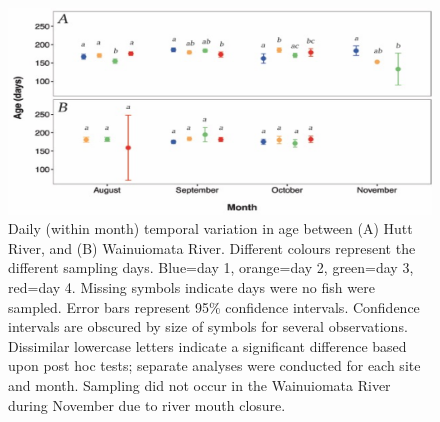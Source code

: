 \documentclass[]{book}
\begin{document}
\begin{figure}
\centering
\includegraphics{images/spatiotemp3.png}
\caption{\label{fig:spatiotemp3}Daily (within month) temporal variation in
age between (A) Hutt River, and (B) Wainuiomata River. Different colours
represent the different sampling days. Blue=day 1, orange=day 2,
green=day 3, red=day 4. Missing symbols indicate days were no fish were
sampled. Error bars represent 95\% confidence intervals. Confidence
intervals are obscured by size of symbols for several observations.
Dissimilar lowercase letters indicate a significant difference based
upon post hoc tests; separate analyses were conducted for each site and
month. Sampling did not occur in the Wainuiomata River during November
due to river mouth closure.}
\end{figure}
\end{document}
